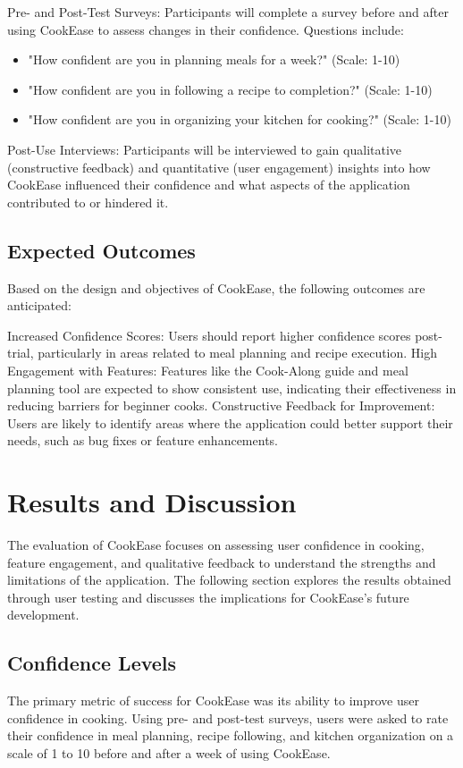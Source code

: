 \documentclass[10pt,twocolumn]{article}
\begin{document}
Pre- and Post-Test Surveys: Participants will complete a survey before and after using CookEase to assess changes in their confidence. Questions include:
\begin{itemize}
    \item "How confident are you in planning meals for a week?" (Scale: 1-10)
    \item "How confident are you in following a recipe to completion?" (Scale: 1-10)
    \item "How confident are you in organizing your kitchen for cooking?" (Scale: 1-10)
\end{itemize}
Post-Use Interviews: Participants will be interviewed to gain qualitative (constructive feedback) and quantitative (user engagement) insights into how CookEase influenced their confidence and what aspects of the application contributed to or hindered it.

\subsection{Expected Outcomes}
Based on the design and objectives of CookEase, the following outcomes are anticipated:

Increased Confidence Scores: Users should report higher confidence scores post-trial, particularly in areas related to meal planning and recipe execution.
High Engagement with Features: Features like the Cook-Along guide and meal planning tool are expected to show consistent use, indicating their effectiveness in reducing barriers for beginner cooks.
Constructive Feedback for Improvement: Users are likely to identify areas where the application could better support their needs, such as bug fixes or feature enhancements.

\section{Results and Discussion}
The evaluation of CookEase focuses on assessing user confidence in cooking, feature engagement, and qualitative feedback to understand the strengths and limitations of the application. The following section explores the results obtained through user testing and discusses the implications for CookEase's future development.

\subsection{Confidence Levels}
The primary metric of success for CookEase was its ability to improve user confidence in cooking. Using pre- and post-test surveys, users were asked to rate their confidence in meal planning, recipe following, and kitchen organization on a scale of 1 to 10 before and after a week of using CookEase.
\end{document}
